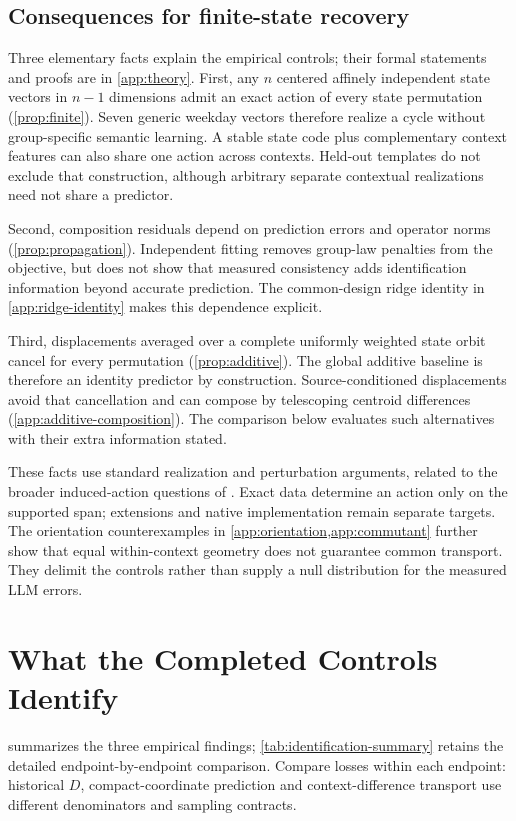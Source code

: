 \documentclass{article}
\begin{document}
\subsection{Consequences for finite-state recovery}
Three elementary facts explain the empirical controls; their formal statements and proofs are in \cref{app:theory}. First, any $n$ centered affinely independent state vectors in $n-1$ dimensions admit an exact action of every state permutation (\cref{prop:finite}). Seven generic weekday vectors therefore realize a cycle without group-specific semantic learning. A stable state code plus complementary context features can also share one action across contexts. Held-out templates do not exclude that construction, although arbitrary separate contextual realizations need not share a predictor.

Second, composition residuals depend on prediction errors and operator norms (\cref{prop:propagation}). Independent fitting removes group-law penalties from the objective, but does not show that measured consistency adds identification information beyond accurate prediction. The common-design ridge identity in \cref{app:ridge-identity} makes this dependence explicit.

Third, displacements averaged over a complete uniformly weighted state orbit cancel for every permutation (\cref{prop:additive}). The global additive baseline is therefore an identity predictor by construction. Source-conditioned displacements avoid that cancellation and can compose by telescoping centroid differences (\cref{app:additive-composition}). The comparison below evaluates such alternatives with their extra information stated.

These facts use standard realization and perturbation arguments, related to the broader induced-action questions of \citet{sun2026transformationlaws}. Exact data determine an action only on the supported span; extensions and native implementation remain separate targets. The orientation counterexamples in \cref{app:orientation,app:commutant} further show that equal within-context geometry does not guarantee common transport. They delimit the controls rather than supply a null distribution for the measured LLM errors.

\section{What the Completed Controls Identify}
\label{sec:evidence}
 summarizes the three empirical findings; \cref{tab:identification-summary} retains the detailed endpoint-by-endpoint comparison. Compare losses within each endpoint: historical $D$, compact-coordinate prediction and context-difference transport use different denominators and sampling contracts.
\end{document}
